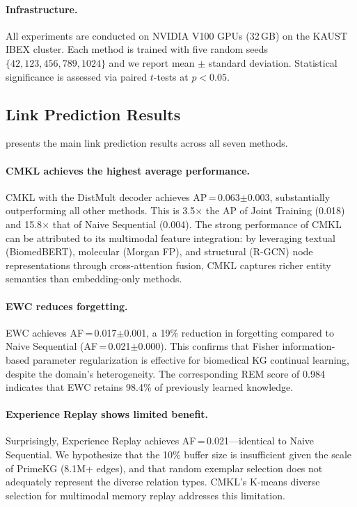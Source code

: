 \paragraph{Infrastructure.}
All experiments are conducted on NVIDIA V100 GPUs (32\,GB) on the KAUST IBEX cluster.
Each method is trained with five random seeds $\{42, 123, 456, 789, 1024\}$ and we report mean $\pm$ standard deviation.
Statistical significance is assessed via paired $t$-tests at $p < 0.05$.

\subsection{Link Prediction Results}
\label{sec:lp_results}

 presents the main link prediction results across all seven methods.



\paragraph{CMKL achieves the highest average performance.}
CMKL with the DistMult decoder achieves AP\,=\,0.063$\pm$0.003, substantially outperforming all other methods.
This is 3.5$\times$ the AP of Joint Training (0.018) and 15.8$\times$ that of Naive Sequential (0.004).
The strong performance of CMKL can be attributed to its multimodal feature integration: by leveraging textual (BiomedBERT), molecular (Morgan FP), and structural (R-GCN) node representations through cross-attention fusion, CMKL captures richer entity semantics than embedding-only methods.

\paragraph{EWC reduces forgetting.}
EWC achieves AF\,=\,0.017$\pm$0.001, a 19\% reduction in forgetting compared to Naive Sequential (AF\,=\,0.021$\pm$0.000).
This confirms that Fisher information-based parameter regularization is effective for biomedical KG continual learning, despite the domain's heterogeneity.
The corresponding REM score of 0.984 indicates that EWC retains 98.4\% of previously learned knowledge.

\paragraph{Experience Replay shows limited benefit.}
Surprisingly, Experience Replay achieves AF\,=\,0.021---identical to Naive Sequential.
We hypothesize that the 10\% buffer size is insufficient given the scale of PrimeKG (8.1M+ edges), and that random exemplar selection does not adequately represent the diverse relation types.
CMKL's K-means diverse selection for multimodal memory replay addresses this limitation.

